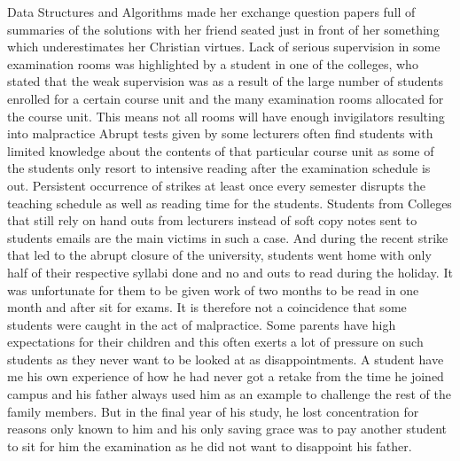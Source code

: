 \documentclass {article}
\begin{document}
Data Structures and Algorithms made her exchange question papers full of summaries of the solutions with her friend seated just in front of her something which underestimates her Christian virtues. Lack of serious supervision in some examination rooms was highlighted by a student in one of the colleges, who stated that the weak supervision was as a result of the large number of students enrolled for a certain course unit and the many examination rooms allocated for the course unit. This means not all rooms will have enough invigilators resulting into malpractice Abrupt tests given by some lecturers often find students with limited knowledge about the contents of that particular course unit as some of the students only resort to intensive reading after the examination schedule is out. Persistent occurrence of strikes at least once every semester disrupts the teaching schedule as well as reading time for the students. Students from Colleges that still rely on hand outs from lecturers instead of soft copy notes sent to students emails are the main victims in such a case. And during the recent strike that led to the abrupt closure of the university, students went home with only half of their respective syllabi done and no and outs to read during the holiday. It was unfortunate for them to be given work of two months to be read in one month and after sit for exams. It is therefore not a coincidence that some students were caught in the act of malpractice. Some parents have high expectations for their children and this often exerts a lot of pressure on such students as they never want to be looked at as disappointments. A student have me his own experience of how he had never got a retake from the time he joined campus and his father always used him as an example to challenge the rest of the family members. But in the final year of his study, he lost concentration for
reasons only known to him and his only saving grace was to pay another student to sit for him the examination as he did not want to disappoint his father.
\end{document}
